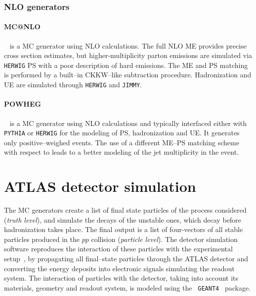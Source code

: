 \subsubsection*{NLO generators}

\paragraph{MC@NLO}~\cite{mcatnlo} is a MC generator using NLO
calculations. The full NLO ME provides precise cross section
estimates, but higher-multiplicity parton emissions are simulated via
\texttt{HERWIG} PS with a poor description of hard emissions. The ME
and PS matching is performed by a built--in CKKW--like subtraction
procedure.
Hadronization and UE are simulated through \texttt{HERWIG} and
\texttt{JIMMY}.

\paragraph{POWHEG}~\cite{powheg} is a MC generator using NLO
calculations and typically interfaced either with \texttt{PYTHIA} or
\texttt{HERWIG} for the modeling of PS, hadronization and UE. It
generates only positive--weighed events. The use of a different ME--PS
matching scheme with respect to \mcatnlo{} leads to a better 
modeling of the jet multiplicity in the event. 

\section{ATLAS detector simulation}
\label{sec:detectorsim}

The MC generators create a list of final state particles of the
process considered ({\it truth level}), and simulate the decays of the
unstable ones, which decay before hadronization takes place. 
The final output is a list of four-vectors of all stable
particles produced in the $pp$ collision ({\it particle level}). 
The detector simulation software reproduces the interaction of these
particles with the experimental setup~\cite{atlas_sim}, by propagating
all final--state particles through the ATLAS detector and converting
the energy deposits into electronic signals simulating the readout
system. 
The interaction of particles with the detector, taking into account
its materials, geometry and readout system, is modeled using the {\tt
  GEANT4}~\cite{geant} package.

